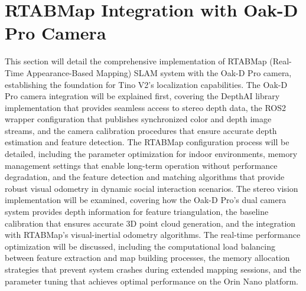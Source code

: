 \section{RTABMap Integration with Oak-D Pro Camera}
This section will detail the comprehensive implementation of RTABMap (Real-Time Appearance-Based Mapping) SLAM system with the Oak-D Pro camera, establishing the foundation for Tino V2's localization capabilities. The Oak-D Pro camera integration will be explained first, covering the DepthAI library implementation that provides seamless access to stereo depth data, the ROS2 wrapper configuration that publishes synchronized color and depth image streams, and the camera calibration procedures that ensure accurate depth estimation and feature detection. The RTABMap configuration process will be detailed, including the parameter optimization for indoor environments, memory management settings that enable long-term operation without performance degradation, and the feature detection and matching algorithms that provide robust visual odometry in dynamic social interaction scenarios. The stereo vision implementation will be examined, covering how the Oak-D Pro's dual camera system provides depth information for feature triangulation, the baseline calibration that ensures accurate 3D point cloud generation, and the integration with RTABMap's visual-inertial odometry algorithms. The real-time performance optimization will be discussed, including the computational load balancing between feature extraction and map building processes, the memory allocation strategies that prevent system crashes during extended mapping sessions, and the parameter tuning that achieves optimal performance on the Orin Nano platform.

